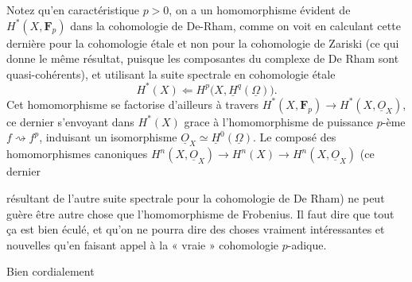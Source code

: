 \documentclass[11pt,a4paper]{article}
\begin{document}
Notez qu'en caractéristique $p > 0$, on a un homomorphisme évident de
$H^{*}(X, \mathbf{F}_p)$ dans la cohomologie de De-Rham, comme on voit en
calculant cette dernière pour la cohomologie étale et non pour la cohomologie
de Zariski (ce qui donne le même résultat, puisque les composantes du
complexe de De Rham sont quasi-cohérents), et utilisant la suite spectrale en
cohomologie étale
\[
H^{*}(X) \Leftarrow H^p\bigl(X, \underline{H}^q(\underline{\Omega})\bigr) .
\]
Cet homomorphisme se factorise d'ailleurs à travers $H^{*}(X, \mathbf{F}_p)
\to H^{*}(X, \underline{O}_X)$, ce dernier s'envoyant dans $H^{*}(X)$ grace à
l'homomorphisme de puissance $p$-ème $f \rightsquigarrow f^p$, induisant un
isomorphisme $\underline{O}_X \simeq \underline{H}^0(\underline{\Omega})$. Le
composé des homomorphismes canoniques $H^n(X, \underline{O}_X) \to H^n(X) \to
H^n(X, \underline{O}_X)$ (ce dernier


résultant de l'autre suite spectrale pour la cohomologie de De Rham) ne peut
guère être autre chose que l'homomorphisme de Frobenius. Il faut dire que
tout ça est bien éculé, et qu'on ne pourra dire des choses vraiment
intéressantes et nouvelles qu'en faisant appel à la « vraie » cohomologie
$p$-adique.

Bien cordialement
\end{document}
